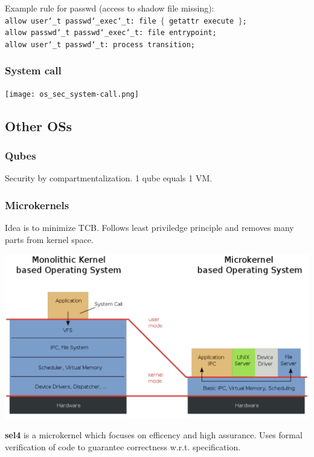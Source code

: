 Example rule for passwd (access to shadow file missing):\\
\texttt{allow user\char`_t passwd\char`_exec\char`_t: file $\{$ getattr execute $\}$; \\ allow passwd\char`_t passwd\char`_exec\char`_t: file entrypoint; \\ allow user\char`_t passwd\char`_t: process transition;}

\subsubsection{System call}
\begin{center}
  \texttt{[image: os\_sec\_system-call.png]}
\end{center}

\subsection{Other OSs}
\subsubsection{Qubes}
Security by compartmentalization. 1 qube equals 1 VM.

\subsubsection{Microkernels}
Idea is to minimize TCB. Follows least priviledge principle and removes many parts from kernel space.
\begin{center}
    \includegraphics[width=0.8\linewidth]{images/os_sec_MicrokernelVSMonolithic.png}
\end{center}

\textbf{sel4} is a microkernel which focuses on efficency and high assurance. Uses formal verification of code to guarantee correctness w.r.t. specification.
